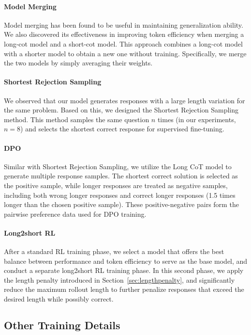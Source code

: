 \documentclass{article}
\begin{document}
\paragraph{Model Merging} Model merging has been found to be useful in maintaining generalization ability. We also discovered its effectiveness in improving token efficiency when merging a long-cot model and a short-cot model. This approach combines a long-cot model with a shorter model to obtain a new one without training. Specifically, we merge the two models by simply averaging their weights.
 \paragraph{Shortest Rejection Sampling} We observed that our model generates responses with a large length variation for the same problem. Based on this, we designed the Shortest Rejection Sampling method. This method samples the same question \(n\) times (in our experiments, \(n=8\)) and selects the shortest correct response for supervised fine-tuning.
 \paragraph{DPO} Similar with Shortest Rejection Sampling, we utilize the Long CoT model to generate multiple response samples. The shortest correct solution is selected as the positive sample, while longer responses are treated as negative samples, including both wrong longer responses and correct longer responses (1.5 times longer than the chosen positive sample). These positive-negative pairs form the pairwise preference data used for DPO training.
 \paragraph{Long2short RL} After a standard RL training phase, we select a model that offers the best balance between performance and token efficiency to serve as the base model, and conduct a separate long2short RL training phase. 
In this second phase, we apply the length penalty introduced in Section~\ref{sec:lengthpenalty}, and significantly reduce the maximum rollout length to further penalize responses that exceed the desired length while possibly correct.



\subsection{Other Training Details}
\label{sec:others}
\end{document}
